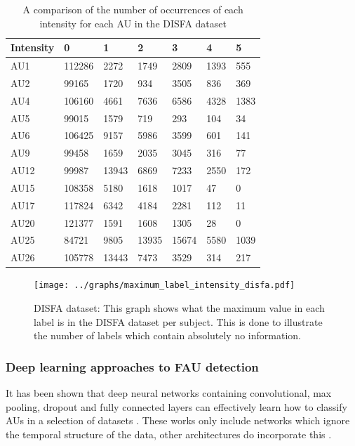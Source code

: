 \documentclass[9pt]{article} \usepackage{amsmath, amsthm, amssymb}
\begin{document}
\begin{table}[h!]
\centering

\begin{tabular}{lllllll}
\hline
Intensity & 0      & 1     & 2     & 3     & 4    & 5    \\ \hline
AU1       & 112286 & 2272  & 1749  & 2809  & 1393 & 555  \\
AU2       & 99165  & 1720  & 934   & 3505  & 836  & 369  \\
AU4       & 106160 & 4661  & 7636  & 6586  & 4328 & 1383 \\
AU5       & 99015  & 1579  & 719   & 293   & 104  & 34   \\
AU6       & 106425 & 9157  & 5986  & 3599  & 601  & 141  \\
AU9       & 99458  & 1659  & 2035  & 3045  & 316  & 77   \\
AU12      & 99987  & 13943 & 6869  & 7233  & 2550 & 172  \\
AU15      & 108358 & 5180  & 1618  & 1017  & 47   & 0    \\
AU17      & 117824 & 6342  & 4184  & 2281  & 112  & 11   \\
AU20      & 121377 & 1591  & 1608  & 1305  & 28   & 0    \\
AU25      & 84721  & 9805  & 13935 & 15674 & 5580 & 1039 \\
AU26      & 105778 & 13443 & 7473  & 3529  & 314  & 217  \\ \hline
\end{tabular}
\caption{A comparison of the number of occurrences of each intensity for each AU in the DISFA dataset} \label{compau}
\end{table}


\begin{figure}[h!]
  \texttt{[image: ../graphs/maximum\_label\_intensity\_disfa.pdf]}
  \caption{DISFA dataset: This graph shows what the maximum value in each label is in the DISFA dataset per subject. This
  is done to illustrate the number of labels which contain absolutely no information.}\label{disfastats}
\end{figure}
\newpage

\subsubsection{Deep learning approaches to FAU detection}
It has been shown that deep neural networks containing convolutional, max pooling,
dropout and fully connected layers can effectively learn how to classify AUs in
a selection of datasets \cite{Gudi2015,Ghosh2015,dodeeplearn}. These
works only include networks which ignore the temporal structure of the data,
other architectures do incorporate this \cite{emonet,Jaiswal2016}.
\end{document}
